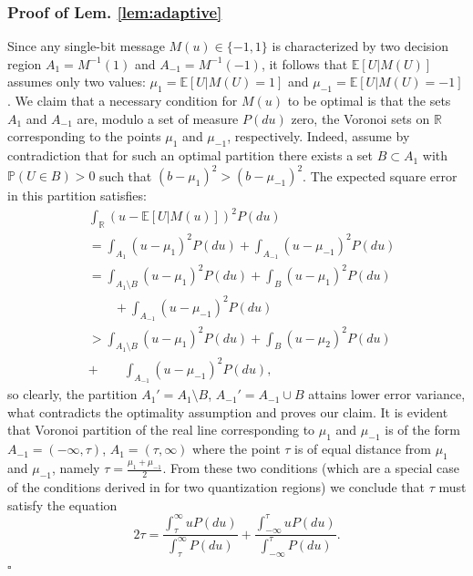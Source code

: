 \documentclass[letterpaper, conference]{IEEEtran}      %
\newcommand*{\QEDA}{\hfill\ensuremath{\square}}
\begin{document}
\subsubsection*{Proof of Lem. \ref{lem:adaptive}}
Since any single-bit message $M(u) \in \{-1,1\}$ is characterized by two decision region $A_1 = M^{-1}(1)$ and $A_{-1} = M^{-1}(-1)$, it follows that $\mathbb E \left[ U | M(U) \right]$ assumes only two values: $\mu_1 = \mathbb E \left[ U | M(U) = 1 \right]$ and $\mu_{-1} = \mathbb E \left[ U | M(U) = -1 \right]$. We claim that a necessary condition for $M(u)$ to be optimal is that the sets $A_1$ and $A_{-1}$ are, modulo a set of measure $P(du)$ zero, the Voronoi sets on $\mathbb R$ corresponding to the points $\mu_1$ and $\mu_{-1}$, respectively. Indeed, assume by contradiction that for such an optimal partition there exists a set $B \subset A_{1}$ with $\mathbb P (U \in B) >0$ such that $\left( b-\mu_{1} \right)^2 > \left( b- \mu_{-1} \right)^2$. The expected square error in this partition satisfies:
\begin{align*}
& \int_{\mathbb R} \left( u - \mathbb E[U|M(u)]  \right)^2 P(du) \\
& = \int_{A_1} (u- \mu_1)^2 P(du) + \int_{A_{-1}} (u- \mu_{-1})^2 P(du) \\
& = \int_{A_1\setminus B} (u- \mu_1)^2 P(du) +  \int_{B} (u- \mu_1)^2 P(du) \\
&\quad \quad + \int_{A_{-1}} (u- \mu_{-1})^2 P(du) \\
& > \int_{A_1\setminus B} (u- \mu_1)^2 P(du) +  \int_{B} (u- \mu_2)^2 P(du) \\
& + \quad \quad  \int_{A_{-1}} (u- \mu_{-1})^2 P(du),
\end{align*}
so clearly, the partition $A_1' = A_1 \setminus B$, $A_{-1}' = A_{-1} \cup B$ attains lower error variance, what contradicts the optimality assumption and proves our claim. It is evident that Voronoi partition of the real line corresponding to $\mu_1$ and $\mu_{-1}$ is of the form $A_{-1} = (-\infty,\tau)$, $A_{1} = (\tau, \infty)$ where the point $\tau$ is of equal distance from $\mu_1$ and $\mu_{-1}$, namely $\tau = \frac{\mu_1 + \mu_{-1}}{2}$. From these two conditions (which are a special case of the conditions derived in \cite{1056489} for two quantization regions) we conclude that $\tau$ must satisfy the equation
\[
2 \tau = \frac{\int_{\tau}^\infty u P(du)}{\int_{\tau}^\infty P(du)} + \frac{\int_{-\infty}^{\tau} u P(du)}{\int_{-\infty}^{\tau} P(du)}.
\] 
\QEDA
\end{document}
